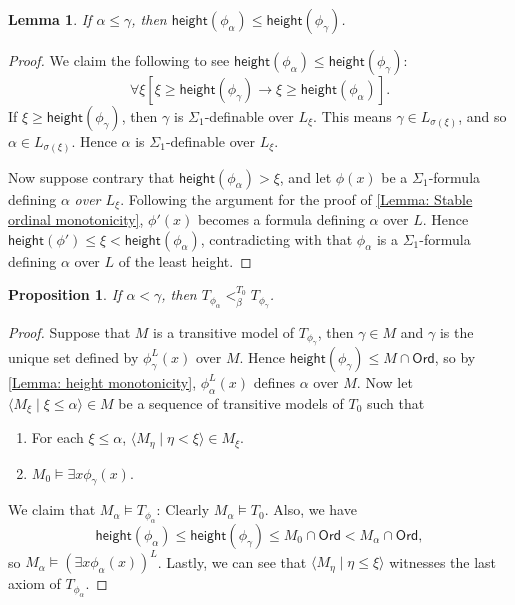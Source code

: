 \documentclass{amsart}
\newtheorem{lemma}[theorem]{Lemma}
\newtheorem{proposition}[proposition]{Proposition}
\theoremstyle{remark}
\newcommand{\height}{\mathsf{height}}
\newcommand{\Ord}{\mathsf{Ord}}
\begin{document}
\begin{lemma} \label{Lemma: height monotonicity}
    If $\alpha\le \gamma$, then $\height(\phi_\alpha) \le \height(\phi_\gamma)$.
\end{lemma}
\begin{proof}
    We claim the following to see $\height(\phi_\alpha) \le \height(\phi_\gamma)$:
    \begin{equation*}
        \forall \xi [\xi\ge\height(\phi_\gamma)\to \xi\ge\height(\phi_\alpha)].
    \end{equation*}
    If $\xi\ge \height(\phi_\gamma)$, then $\gamma$ is $\Sigma_1$-definable over $L_\xi$.
    This means $\gamma\in L_{\sigma(\xi)}$, and so $\alpha\in L_{\sigma(\xi)}$.
    Hence $\alpha$ is $\Sigma_1$-definable over $L_\xi$. 
    
    Now suppose contrary that  $\height(\phi_\alpha)>\xi$, and let $\phi(x)$ be a $\Sigma_1$-formula defining $\alpha$ \emph{over $L_\xi$}. Following the argument for the proof of \autoref{Lemma: Stable ordinal monotonicity}, $\phi'(x)$ becomes a formula defining $\alpha$ over $L$.
    Hence $\height(\phi') \le \xi < \height(\phi_\alpha)$, contradicting with that $\phi_\alpha$ is a $\Sigma_1$-formula defining $\alpha$ over $L$ of the least height.
\end{proof}

\begin{proposition}
    If $\alpha<\gamma$, then $T_{\phi_\alpha} <_\beta^{T_0} T_{\phi_\gamma}$.
\end{proposition}
\begin{proof}
    Suppose that $M$ is a transitive model of $T_{\phi_\gamma}$, then $\gamma\in M$ and $\gamma$ is the unique set defined by $\phi_\gamma^L(x)$ over $M$. Hence $\height(\phi_\gamma)\le M\cap \Ord$, so by \autoref{Lemma: height monotonicity}, $\phi_\alpha^L(x)$ defines $\alpha$ over $M$.
    Now let $\langle M_\xi \mid \xi\le\alpha\rangle \in M$ be a sequence of transitive models of $T_0$ such that
    \begin{enumerate}
        \item For each $\xi\le \alpha$, $\langle M_\eta\mid \eta<\xi\rangle \in M_\xi$.
        \item $M_0\vDash \exists x \phi_\gamma(x)$.
    \end{enumerate}
    We claim that $M_\alpha\vDash T_{\phi_\alpha}$: Clearly $M_\alpha\vDash T_0$.
    Also, we have
    \begin{equation*}
        \height(\phi_\alpha)\le \height(\phi_\gamma)\le M_0\cap \Ord < M_\alpha\cap \Ord,
    \end{equation*}
    so $M_\alpha\vDash (\exists x \phi_\alpha(x))^L$. Lastly, we can see that $\langle M_\eta\mid \eta \le\xi\rangle$ witnesses the last axiom of $T_{\phi_\alpha}$.
\end{proof}
\end{document}

